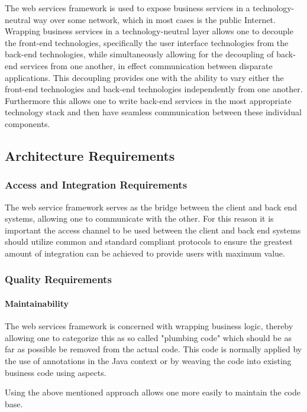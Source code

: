 The web services framework is used to expose business services in a
technology-neutral way over some network, which in most cases is the public
Internet.  Wrapping business services in a technology-neutral layer allows
one to decouple the front-end technologies, specifically the user interface
technologies from the back-end technologies, while simultaneously allowing for the decoupling
of back-end services from one another, in effect communication between disparate
applications.  This decoupling provides one with the ability to vary either the
front-end technologies and back-end technologies independently from one
another.  Furthermore this allows one to write back-end services in the most
appropriate technology stack and then have seamless communication between these
individual components.

\subsection{Architecture Requirements}
\subsubsection{Access and Integration Requirements}
The web service framework serves as the bridge between the client and back end
systems, allowing one to communicate with the other. For this reason it is
important the access channel to be used between the client and back end systems
should utilize common and standard compliant protocols to ensure the greatest
amount of integration can be achieved to provide users with maximum value.

\subsubsection{Quality Requirements}
\paragraph*{Maintainability}
\label{sec:webServicesFrameworkMaintainability}
The web services framework is concerned with wrapping business logic, thereby
allowing one to categorize this as so called "plumbing code" which should be as
far as possible be removed from the actual code. This code is normally applied
by the use of annotations in the Java context or by weaving the code into
existing business code using aspects.

Using the above mentioned approach allows one more easily to maintain the code
base.


